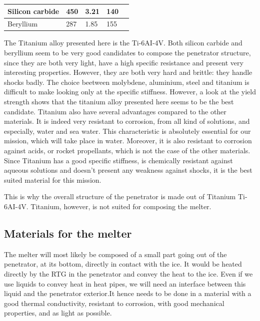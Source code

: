 \begin{table}[htb]
\begin{tabular}{l|l|l|l|l|}
\multicolumn{1}{|l|}{Silicon carbide} & 450                                                            & 3.21                                                      & 140                                                                       &                                                                 \\ \hline
\multicolumn{1}{|l|}{Beryllium}       & 287                                                            & 1.85                                                      & 155                                                                       &                                                                 \\ \hline
\end{tabular}
\end{table}

The Titanium alloy presented here is the Ti-6AI-4V.
Both silicon carbide and beryllium seem to be very good candidates to compose the penetrator structure, since they are both very light, have a high specific resistance and present very interesting properties. However, they are both very hard and brittle: they handle shocks badly.
The choice beetween molybdene, aluminium, steel and titanium is difficult to make looking only at the specific stiffness. However, a look at the yield strength shows that the titanium alloy presented here seems to be the best candidate.
Titanium also have several advantages compared to the other materials. It is indeed very resistant to corrosion, from all kind of solutions, and especially, water and sea water. This characteristic is absolutely essential for our mission, which will take place in water. Moreover, it is also resistant to corrosion against acids, or rocket propellants, which is not the case of the other materials. Since Titanium has a good specific stiffness, is chemically resistant against aqueous solutions and doesn't present any weakness against shocks, it is the best suited material for this mission.

This is why the overall structure of the penetrator is made out of Titanium Ti-6AI-4V. Titanium, however, is not suited for composing the melter.

\subsection{Materials for the melter}

The melter will most likely be composed of a small part going out of the penetrator, at its bottom, directly in contact with the ice. It would be heated directly by the RTG in the penetrator and convey the heat to the ice. Even if we use liquids to convey heat in heat pipes, we will need an interface between this liquid and the penetrator exterior.It hence needs to be done in a material with a good thermal conductivity, resistant to corrosion, with good mechanical properties, and as light as possible.

